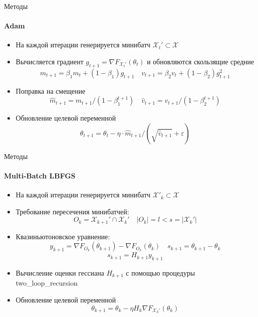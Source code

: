 \documentclass{beamer}
\begin{document}

\begin{frame}{Методы}
\framesubtitle{Adam}
\begin{itemize}
    \item На каждой итерации генерируется минибатч $\mathcal{X}_t' \subset \mathcal{X}$
    \item Вычисляется градиент $g_{t+1} = \nabla F_{\mathcal{X}_t'}(\theta_t)$ и обновляются скользящие средние
    $$m_{t+1} = \beta_1  m_t + (1 - \beta_1) g_{t+1} \quad v_{t+1} = \beta_2  v_t + (1 - \beta_2) g_{t+1}^2$$
    \item Поправка на смещение
    $$\hat{m}_{t+1} = m_{t+1} / (1 - \beta_1^{t+1}) \quad \hat{v}_{t+1} = v_{t+1} / (1 - \beta_2^{t+1})$$
    \item Обновление целевой переменной
    $$\theta_{t+1} = \theta_t - \eta \cdot \hat{m}_{t+1}/(\sqrt{\hat{v}_{t+1}} + \varepsilon)$$
\end{itemize}
\end{frame}


\begin{frame}{Методы}
\framesubtitle{Multi-Batch LBFGS}
\begin{itemize}
    \item На каждой итерации генерируется минибатч $\mathcal{X}'_k \subset \mathcal{X}$
    \item Требование пересечения минибатчей: 
    $$O_k = \mathcal{X}_{k+1}' \cap \mathcal{X}_k' \quad  |O_k| = l < s = |\mathcal{X}_k'|$$
    \item Квазиньютоновское уравнение:
    $$y_{k+1} = \nabla F_{O_k}(\theta_{k+1}) - \nabla F_{O_k}(\theta_k) \quad s_{k+1} = \theta_{k+1} - \theta_k$$
    $$s_{k+1} = H_{k+1}y_{k+1}$$
    \item Вычисление оценки гессиана $H_{k+1}$ с помощью процедуры two\_loop\_recursion
    \item Обновление целевой переменной
    $$\theta_{k+1} = \theta_k - \eta H_k \nabla F_{\mathcal{X}_k'}(\theta_k)$$
\end{itemize}
\end{frame}

\end{document}
